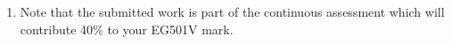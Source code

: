 \documentclass[12pts,a4paper,amsmath,amssymb,floatfix]{article}%
\begin{document}
\begin{enumerate}[1)]
\item Note that the submitted work is part of the continuous assessment which will contribute 40$\%$ to your EG501V mark.

\end{enumerate}
\end{document}
